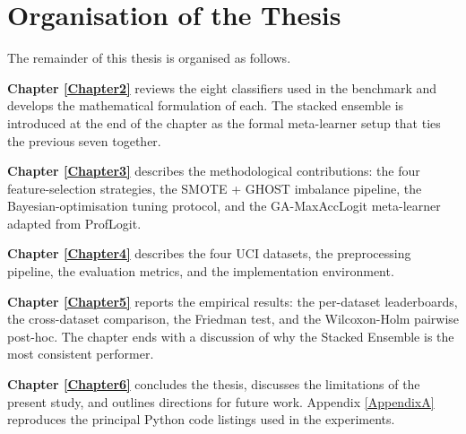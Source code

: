 \section{Organisation of the Thesis}
\label{sec:organisation}

The remainder of this thesis is organised as follows.

\textbf{Chapter \ref{Chapter2}} reviews the eight classifiers used
in the benchmark and develops the mathematical formulation of each.
The stacked ensemble is introduced at the end of the chapter as the
formal meta-learner setup that ties the previous seven together.

\textbf{Chapter \ref{Chapter3}} describes the methodological
contributions: the four feature-selection strategies, the SMOTE +
GHOST imbalance pipeline, the Bayesian-optimisation tuning protocol,
and the GA-MaxAccLogit meta-learner adapted from ProfLogit.

\textbf{Chapter \ref{Chapter4}} describes the four UCI datasets,
the preprocessing pipeline, the evaluation metrics, and the
implementation environment.

\textbf{Chapter \ref{Chapter5}} reports the empirical results: the
per-dataset leaderboards, the cross-dataset comparison, the Friedman
test, and the Wilcoxon-Holm pairwise post-hoc. The chapter ends with
a discussion of why the Stacked Ensemble is the most consistent
performer.

\textbf{Chapter \ref{Chapter6}} concludes the thesis, discusses the
limitations of the present study, and outlines directions for future
work. Appendix \ref{AppendixA} reproduces the principal Python code
listings used in the experiments.
